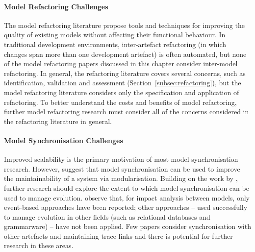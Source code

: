 \paragraph{Model Refactoring Challenges} The model refactoring literature propose tools and techniques for improving the quality of existing models without affecting their functional behaviour. In traditional development environments, inter-artefact refactoring (in which changes span more than one development artefact) is often automated, but none of the model refactoring papers discussed in this chapter consider inter-model refactoring. In general, the refactoring literature covers several concerns, such as identification, validation and assessment (Section~\ref{subsec:refactoring}), but the model refactoring literature considers only the specification and application of refactoring. To better understand the costs and benefits of model refactoring, further model refactoring research must consider all of the concerns considered in the refactoring literature in general.

\paragraph{Model Synchronisation Challenges} Improved scalability is the primary motivation of most model synchronisation research. However, \cite{fritzsche08tracing} suggest that model synchronisation can be used to improve the maintainability of a system via modularisation. Building on the work by \cite{fritzsche08tracing}, further research should explore the extent to which model synchronisation can be used to manage evolution. \cite{winkler09survey} observe that, for impact analysis between models, only event-based approaches have been reported; other approaches -- used successfully to manage evolution in other fields (such as relational databases and grammarware) -- have not been applied. Few papers consider synchronisation with other artefacts and maintaining trace links and there is potential for further research in these areas.

